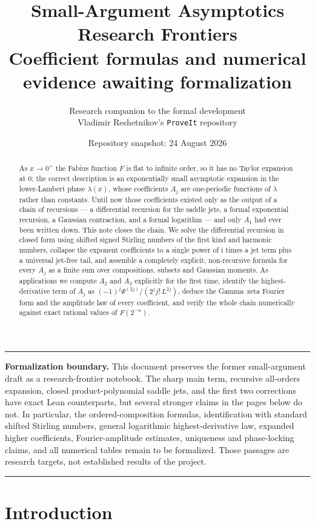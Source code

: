 \documentclass[11pt,oneside]{article}
\title{\bfseries Small-Argument Asymptotics Research Frontiers\\[0.35em]
\large Coefficient formulas and numerical evidence awaiting formalization}
\author{Research companion to the formal development\\
\small Vladimir Reshetnikov's \texttt{ProveIt} repository}
\date{Repository snapshot: 24 August 2026}
\theoremstyle{definition}
\theoremstyle{remark}
\newcommand{\ii}{\mathrm i}
\newenvironment{boxedremark}{%
  \par\smallskip\noindent\begin{center}\begin{minipage}{0.94\textwidth}%
  \color{black}\hrule\vspace{0.6em}\small
}{%
  \vspace{0.6em}\hrule\end{minipage}\end{center}\smallskip
}
\begin{document}
\maketitle

\begin{abstract}
As $x\to0^+$ the Fabius function $F$ is flat to infinite order, so it has no
Taylor expansion at $0$; the correct description is an exponentially small
asymptotic expansion in the lower-Lambert phase $\lambda(x)$, whose
coefficients $A_j$ are one-periodic functions of $\lambda$ rather than
constants.  Until now those coefficients existed only as the output of a chain
of recursions --- a differential recursion for the saddle jets, a formal
exponential recursion, a Gaussian contraction, and a formal logarithm --- and
only $A_1$ had ever been written down.  This note closes the chain.  We solve
the differential recursion in closed form using shifted signed Stirling numbers
of the first kind and harmonic numbers, collapse the exponent coefficients to a single
power of $\ii$ times a jet term plus a universal jet-free tail, and assemble a
completely explicit, non-recursive formula for every $A_j$ as a finite sum over
compositions, subsets and Gaussian moments.  As applications we compute $A_2$
and $A_3$ explicitly for the first time, identify the highest-derivative term
of $A_j$ as $(-1)^j\Psi^{(2j)}/(2^jj!\,L^{2j})$, deduce the
Gamma--zeta Fourier form and the amplitude law of every coefficient, and verify
the whole chain numerically against exact rational values of $F(2^{-n})$.
\end{abstract}

\begin{boxedremark}
\textbf{Formalization boundary.}
This document preserves the former small-argument draft as a research-frontier notebook.
The sharp main term, recursive all-orders expansion, closed product-polynomial saddle jets,
and the first two corrections have exact Lean counterparts, but several stronger claims in
the pages below do not.  In particular, the ordered-composition formulas, identification
with standard shifted Stirling numbers, general logarithmic highest-derivative law,
expanded higher coefficients, Fourier-amplitude estimates, uniqueness and phase-locking
claims, and all numerical tables remain to be formalized.  Those passages are research
targets, not established results of the project.
\end{boxedremark}

\tableofcontents

\section{Introduction}
\end{document}
